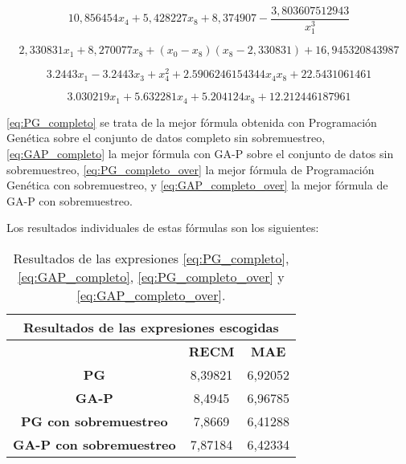 \begin{equation} \label{eq:PG_completo}
10,856454 x_{4} + 5,428227 x_{8} + 8,374907 - \frac{3,803607512943}{x_{1}^{3}}
\end{equation}


\begin{equation} \label{eq:GAP_completo}
2,330831 x_{1} + 8,270077 x_{8} + \left(x_{0} - x_{8}\right) \left(x_{8} - 2,330831\right) + 16,945320843987
\end{equation}


\begin{equation} \label{eq:PG_completo_over}
3.2443 x_{1} - 3.2443 x_{3} + x_{4}^{2} + 2.5906246154344 x_{4} x_{8} + 22.5431061461
\end{equation}


\begin{equation} \label{eq:GAP_completo_over}
3.030219 x_{1} + 5.632281 x_{4} + 5.204124 x_{8} + 12.212446187961
\end{equation}

\ref{eq:PG_completo} se trata de la mejor fórmula obtenida con Programación Genética sobre el conjunto de datos completo sin sobremuestreo, \ref{eq:GAP_completo} la mejor fórmula con GA-P sobre el conjunto de datos sin sobremuestreo, \ref{eq:PG_completo_over} la mejor fórmula de Programación Genética con sobremuestreo, y \ref{eq:GAP_completo_over} la mejor fórmula de GA-P con sobremuestreo.

Los resultados individuales de estas fórmulas son los siguientes:

\begin{table}[]
\centering
\begin{tabular}{|c|c|c|}
\hline
\multicolumn{3}{|c|}{\textbf{Resultados de las expresiones escogidas}}   \\ \hline
\textbf{}                       & \textbf{RECM}    & \textbf{MAE}        \\ \hline
\textbf{PG}                     & 8,39821          & 6,92052             \\ \hline
\textbf{GA-P}                   & 8,4945           & 6,96785             \\ \hline
\textbf{PG con sobremuestreo}   & 7,8669           & 6,41288             \\ \hline
\textbf{GA-P con sobremuestreo} & 7,87184          & 6,42334             \\ \hline
\end{tabular}%
\caption{Resultados de las expresiones \ref{eq:PG_completo}, \ref{eq:GAP_completo}, \ref{eq:PG_completo_over} y \ref{eq:GAP_completo_over}.}\label{table:resultados_escogidas}
\end{table}

